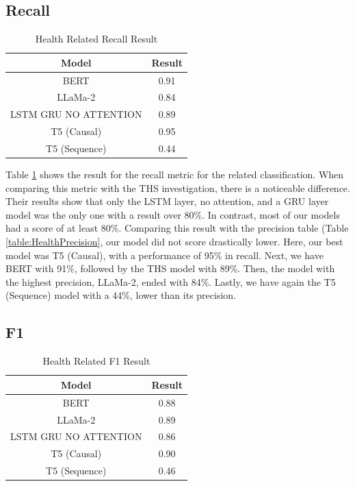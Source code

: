 \subsection{Recall}
\begin{table}[H]
	\centering
	\caption{Health Related Recall Result}
	\begin{tabular}{||c | c||} 
		\hline
		\textbf{Model} & \textbf{Result} \\ [0.5ex] 
		\hline
		BERT & 0.91  \\
		\hline
		LLaMa-2 & 0.84 \\ 
		\hline
		LSTM GRU NO ATTENTION & 0.89  \\
		\hline
		T5 (Causal) & 0.95 \\
		\hline
		T5 (Sequence) & 0.44 \\
		\hline
	\end{tabular}
	\label{table:HealthRecall}
\end{table}

Table \ref{table:HealthRecall} shows the result for the recall metric for the related classification. When comparing this metric with the THS investigation, there is a noticeable difference. Their results
show that only the LSTM layer, no attention, and a GRU layer model was the only one with a result over 80\%. In contrast, most of our models had a score of at least 80\%. Comparing this result
with the precision table (Table \ref{table:HealthPrecision}, our model did not score drastically lower. Here, our best model was T5 (Causal), with a performance of 95\% in recall. Next, we have
BERT with 91\%, followed by the THS model with 89\%. Then, the model with the highest precision, LLaMa-2, ended with 84\%. Lastly, we have again the T5 (Sequence) model with a 44\%,
lower than its precision.

\subsection{F1}
\begin{table}[H]
	\centering
	\caption{Health Related F1 Result}
	\begin{tabular}{||c | c||} 
		\hline
		\textbf{Model} & \textbf{Result} \\ [0.5ex] 
		\hline
		BERT & 0.88  \\
		\hline
		LLaMa-2 & 0.89 \\ 
		\hline
		LSTM GRU NO ATTENTION & 0.86  \\
		\hline
		T5 (Causal) & 0.90 \\
		\hline
		T5 (Sequence) & 0.46 \\
		\hline
	\end{tabular}
	\label{table:HealthF1}
\end{table}

